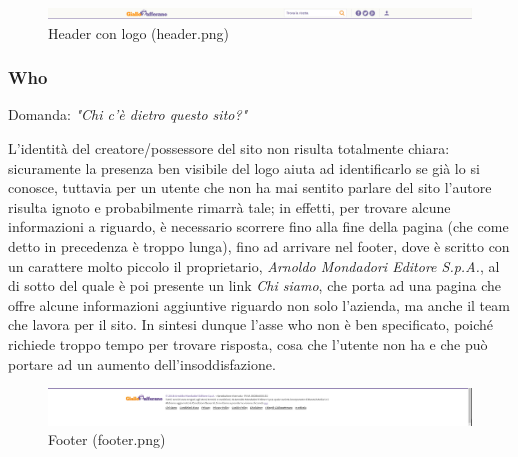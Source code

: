 \begin{figure}[h!]
	\centerline{
	\includegraphics[scale=0.25]{images/homepage/header.png}}
	\caption{Header con logo (header.png)}
\end{figure}


\subsubsection{Who} 

Domanda: \textit{"Chi c'è dietro questo sito?"}

L'identità del creatore/possessore del sito non risulta totalmente chiara: sicuramente la presenza ben visibile del logo aiuta ad identificarlo se già lo si conosce, tuttavia per un utente che non ha mai sentito parlare del sito l'autore risulta ignoto e probabilmente rimarrà tale; in effetti, per trovare alcune informazioni a riguardo, è necessario scorrere fino alla fine della pagina (che come detto in precedenza è troppo lunga), fino ad arrivare nel footer, dove è scritto con un carattere molto piccolo il proprietario, \textit{Arnoldo Mondadori Editore S.p.A.}, al di sotto del quale è poi presente un link \textit{Chi siamo}, che porta ad una pagina che offre alcune informazioni aggiuntive riguardo non solo l'azienda, ma anche il team che lavora per il sito.
In sintesi dunque l'asse who non è ben specificato, poiché richiede troppo tempo per trovare risposta, cosa che l'utente non ha e che può portare ad un aumento dell'insoddisfazione.

\begin{figure}[h!]
	\centerline{
	\includegraphics[scale=0.25]{images/homepage/footer.png}}
	\caption{Footer (footer.png)}
\end{figure}

